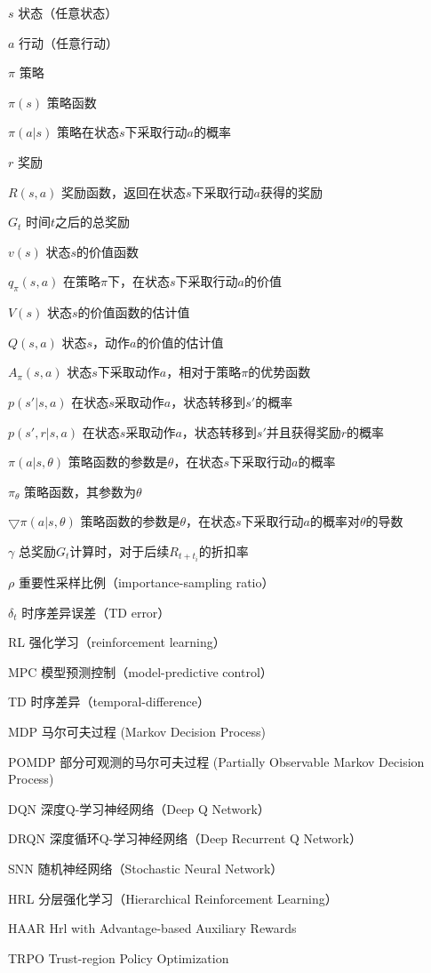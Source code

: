 \begin{denotation}[3cm]
\item[$s$] 状态（任意状态）
\item[$a$] 行动（任意行动）
\item[$\pi$] 策略
\item[$\pi(s)$] 策略函数
\item[$\pi(a|s)$] 策略在状态$s$下采取行动$a$的概率
\item[$r$] 奖励
\item[$R(s, a)$] 奖励函数，返回在状态$s$下采取行动$a$获得的奖励
\item[$G_t$] 时间$t$之后的总奖励
\item[$v(s)$] 状态$s$的价值函数
\item[$q_\pi(s, a)$] 在策略$\pi$下，在状态$s$下采取行动$a$的价值
\item[$V(s)$] 状态$s$的价值函数的估计值
\item[$Q(s, a)$] 状态$s$，动作$a$的价值的估计值
\item[$A_{\pi}(s, a)$] 状态$s$下采取动作$a$，相对于策略$\pi$的优势函数
\item[$p(s'|s, a)$] 在状态$s$采取动作$a$，状态转移到$s'$的概率
\item[$p(s', r|s, a)$] 在状态$s$采取动作$a$，状态转移到$s'$并且获得奖励$r$的概率
\item[$\pi(a|s, \theta)$] 策略函数的参数是$\theta$，在状态$s$下采取行动$a$的概率
\item[$\pi_\theta$] 策略函数，其参数为$\theta$
\item[$\bigtriangledown \pi(a|s, \theta)$] 策略函数的参数是$\theta$，在状态$s$下采取行动$a$的概率对$\theta$的导数
\item[$\gamma$] 总奖励$G_t$计算时，对于后续$R_{t+t_i}$的折扣率
\item[$\rho$] 重要性采样比例（importance-sampling ratio）
\item[$\delta_t$] 时序差异误差（TD error）
\item[RL] 强化学习（reinforcement learning）
\item[MPC] 模型预测控制（model-predictive control）
\item[TD] 时序差异（temporal-difference）
\item[MDP] 马尔可夫过程 (Markov Decision Process)
\item[POMDP] 部分可观测的马尔可夫过程 (Partially Observable Markov Decision Process)
\item[DQN] 深度Q-学习神经网络（Deep Q Network）
\item[DRQN] 深度循环Q-学习神经网络（Deep Recurrent Q Network）
\item[SNN] 随机神经网络（Stochastic Neural Network）
\item[HRL] 分层强化学习（Hierarchical Reinforcement Learning）
\item[HAAR] Hrl with Advantage-based Auxiliary Rewards
\item[TRPO] Trust-region Policy Optimization
\end{denotation}
